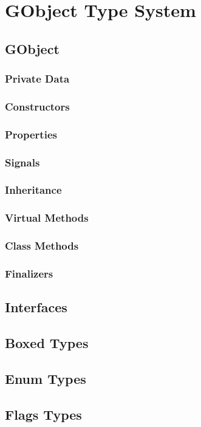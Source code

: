 \chapter{GObject Type System}

\section{GObject}
\subsection{Private Data}
\subsection{Constructors}
\subsection{Properties}
\subsection{Signals}
\subsection{Inheritance}
\subsection{Virtual Methods}
\subsection{Class Methods}
\subsection{Finalizers}

\section{Interfaces}
\section{Boxed Types}
\section{Enum Types}
\section{Flags Types}
